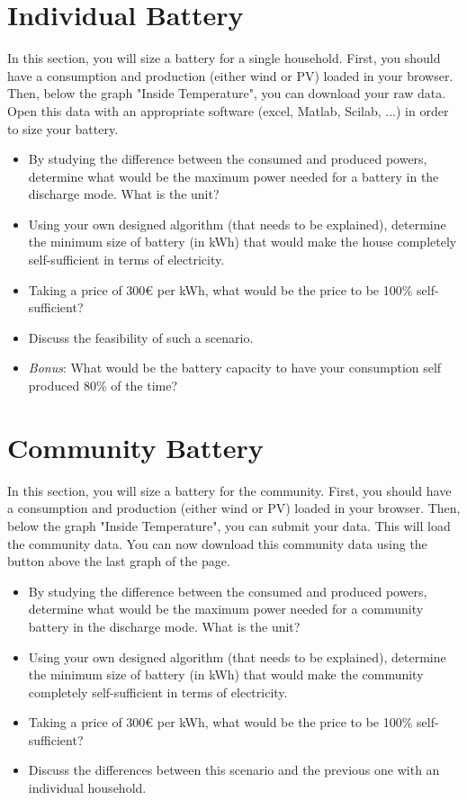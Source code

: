 \documentclass[a4paper, chapterprefix=true, openany]{scrbook}
\begin{document}
\section{Individual Battery}
In this section, you will size a battery for a single household.
First, you should have a consumption and production (either wind or PV) loaded in your browser.
Then, below the graph "Inside Temperature", you can download your raw data.
Open this data with an appropriate software (excel, Matlab, Scilab, ...) in order to size your battery. 

\begin{itemize}
	\item By studying the difference between the consumed and produced powers, determine what would be the maximum power needed for a battery in the discharge mode. What is the unit?
	\item Using your own designed algorithm (that needs to be explained), determine the minimum size of battery (in kWh) that would make the house completely self-sufficient in terms of electricity.
	\item Taking a price of 300€ per kWh, what would be the price to be 100\% self-sufficient?
	\item Discuss the feasibility of such a scenario.
	\item \textit{Bonus}: What would be the battery capacity to have your consumption self produced 80\% of the time?
	\end{itemize}

\section{Community Battery}
In this section, you will size a battery for the community.
First, you should have a consumption and production (either wind or PV) loaded in your browser.
Then, below the graph "Inside Temperature", you can submit your data.
This will load the community data. You can now download this community data using the button above the last graph of the page. 

\begin{itemize}
	\item By studying the difference between the consumed and produced powers, determine what would be the maximum power needed for a community battery in the discharge mode. What is the unit?
	\item Using your own designed algorithm (that needs to be explained), determine the minimum size of battery (in kWh) that would make the community completely self-sufficient in terms of electricity.
	\item Taking a price of 300€ per kWh, what would be the price to be 100\% self-sufficient?
	\item Discuss the differences between this scenario and the previous one with an individual household.

\end{itemize}
\end{document}
